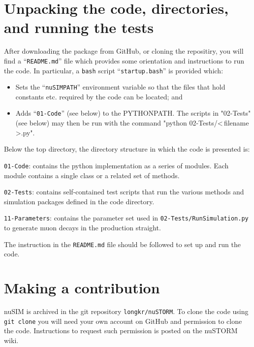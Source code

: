 \section*{Unpacking the code, directories, and running the tests}
After downloading the package from GitHub, or cloning the repositiry,
you will find a ``\verb+README.md+'' file which provides some orientation
and instructions to run the code.
In particular, a \verb+bash+ script ``\verb+startup.bash+'' is
provided which:
\begin{itemize}
  \item Sets the ``\verb+nuSIMPATH+'' environment variable so that the
    files that hold constants etc. required by the code can be
    located; and
  \item Adds ``\verb+01-Code+'' (see below) to the PYTHONPATH.
    The scripts in "02-Tests" (see below) may then be run with the
    command "python 02-Tests/\textless\,filename\,\textgreater.py".
\end{itemize}
Below the top directory, the directory structure in which the code is
presented is:
\begin{description}
  \item\verb+01-Code+: contains the python implementation as a
    series of modules.
    Each module contains a single class or a related set of methods.
  \item\verb+02-Tests+: contains self-contained test scripts that
    run the various methods and simulation packages defined in the
    code directory.
  \item\verb+11-Parameters+: contains the parameter set used in
    \verb+02-Tests/RunSimulation.py+ to generate muon decays in
    the production straight.
\end{description}
The instruction in the \verb+README.md+ file should be followed to set
up and run the code.
  
\section*{Making a contribution}
nuSIM is archived in the git repository \verb+longkr/nuSTORM+.
To clone the code using
\verb+git clone+ you will need your own account on GitHub and
permission to clone the code. 
Instructions to request such permission is posted on the nuSTORM
wiki.
